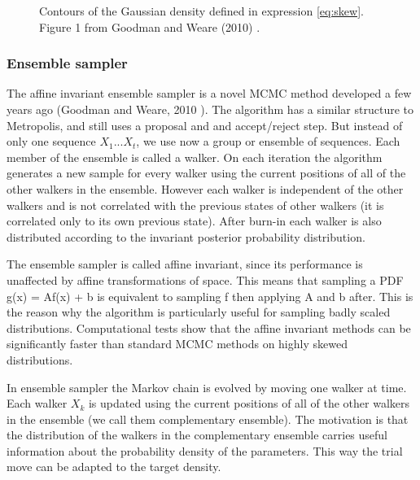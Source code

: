 \documentclass{wihuri}
\begin{document}
\begin{figure}
\centerline{}
\caption{Contours of the Gaussian density defined in expression \ref{eq:skew}. Figure 1 from Goodman and Weare (2010) \cite{ensemble1}.
\label{fig:skewed}}
\end{figure}


\subsubsection{Ensemble sampler}

The affine invariant ensemble sampler is a novel MCMC method developed a few years ago (Goodman and Weare, 2010 \cite{ensemble1}). The algorithm has a similar structure to Metropolis, and still uses a proposal and and accept/reject step. But instead of only one sequence $X_{1}...X_{t}$, we use now a group or ensemble of sequences. Each member of the ensemble is called a walker. On each iteration the algorithm generates a new sample for every walker using the  current positions of all of the other walkers in
the ensemble. However each walker is independent of the other walkers and is not correlated with the previous states of other walkers (it is correlated only to its own previous state). After burn-in each walker is also distributed according to the invariant posterior probability distribution.





The ensemble sampler is called affine invariant, since its performance is unaffected by affine transformations of space. This means that sampling a PDF g(x) = Af(x) + b is equivalent to sampling
f then applying A and b after. This is the reason why the algorithm is particularly useful for sampling badly scaled distributions. Computational tests show that the affine invariant methods can be significantly faster than standard MCMC methods on highly skewed distributions.

In ensemble sampler the  Markov chain is evolved by moving one walker at time. Each walker $X_{k}$ is updated using the current positions of all of the other walkers in
the ensemble (we call them complementary ensemble). The motivation is that the distribution of the walkers in the complementary ensemble carries useful information about the probability density of the parameters. This way the trial move can be adapted to the target density.  
\end{document}
